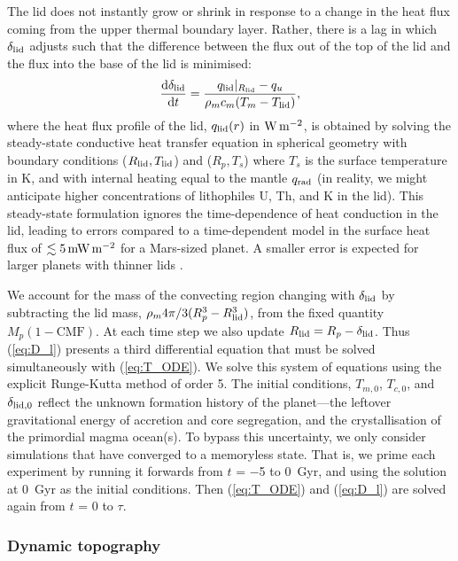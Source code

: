 \documentclass[trackchanges]{aastex63}
\begin{document}
The lid does not instantly grow or shrink in response to a change in the heat flux coming from the upper thermal boundary layer. Rather, there is a lag in which $\delta_{\rm lid}$ adjusts such that the difference between the flux out of the top of the lid and the flux into the base of the lid is minimised:
\begin{equation}\label{eq:D_l}
\frac{{\rm d} \delta_{\rm lid}}{{\rm d} t} = \frac{q_{\rm lid}\vert_{R_{\rm lid}} -q_u}{\rho_m c_{m} (T_m - T_{\rm lid})},
\end{equation}
where the heat flux profile of the lid, $q_{\rm lid}(r)$ in ${\rm W\,m^{-2}}$, is obtained by solving the steady-state conductive heat transfer equation in spherical geometry with boundary conditions ($R_{\rm lid}, T_{\rm lid}$) and ($R_p, T_s$) where $T_s$ is the surface temperature in K, and with internal heating equal to the mantle $q_{\rm rad}$ (in reality, we might anticipate higher concentrations of lithophiles U, Th, and K in the lid). This steady-state formulation ignores the time-dependence of heat conduction in the lid, leading to errors compared to a time-dependent model in the surface heat flux of $\lesssim 5\,\rm{mW\,m^{-2}}$ for a Mars-sized planet. A smaller error is expected for larger planets with thinner lids \citep{thiriet_scaling_2019}. 

We account for the mass of the convecting region changing with $\delta_{\rm lid}$ by subtracting the lid mass, $\rho_m 4\pi/3  (R_p^3 - R_{\rm lid}^3)$, from the fixed quantity $M_p(1 - \text{CMF})$. At each time step we also update $R_{\rm lid} = R_p - \delta_{\rm lid}$. Thus (\ref{eq:D_l}) presents a third differential equation that must be solved simultaneously with (\ref{eq:T_ODE}). We solve this system of equations using the explicit Runge-Kutta method of order 5. The initial conditions, $T_{m,0}$, $T_{c,0}$, and $\delta_{{\rm lid}, 0}$ reflect the unknown formation history of the planet---the leftover gravitational energy of accretion and core segregation, and the crystallisation of the primordial magma ocean(s). To bypass this uncertainty, we only consider simulations that have converged to a memoryless state. That is, we prime each experiment by running it forwards from $t$ = $-$5 to 0~Gyr, and using the solution at 0~Gyr as the initial conditions. Then (\ref{eq:T_ODE}) and (\ref{eq:D_l}) are solved again from $t$ = 0 to $\tau$.


\subsubsection{Dynamic topography}
\end{document}
